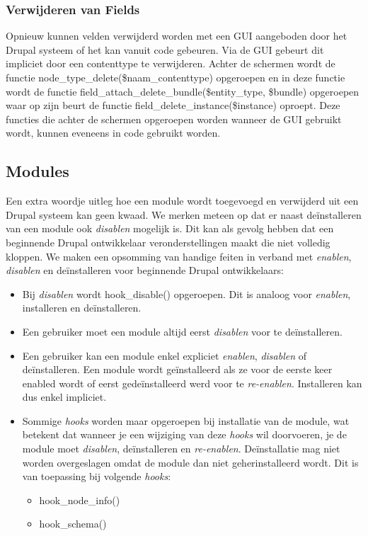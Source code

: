 \subsubsection{Verwijderen van Fields}
Opnieuw kunnen velden verwijderd worden met een GUI aangeboden door het Drupal systeem of het kan vanuit code gebeuren. Via de GUI gebeurt dit impliciet door een contenttype te verwijderen. Achter de schermen wordt de functie node\_type\_delete(\$naam\_contenttype) opgeroepen en in deze functie wordt de functie field\_attach\_delete\_bundle(\$entity\_type, \$bundle) opgeroepen waar op zijn beurt de functie field\_delete\_instance(\$instance) oproept. Deze functies die achter de schermen opgeroepen worden wanneer de GUI gebruikt wordt, kunnen eveneens in code gebruikt worden.

\subsection{Modules}
Een extra woordje uitleg hoe een module wordt toegevoegd en verwijderd uit een Drupal systeem kan geen kwaad. We merken meteen op dat er naast de\"{i}nstalleren van een module ook \textit{disablen} mogelijk is. Dit kan als gevolg hebben dat een beginnende Drupal ontwikkelaar veronderstellingen maakt die niet volledig kloppen. We maken een opsomming van handige feiten in verband met \textit{enablen}, \textit{disablen} en de\"{i}nstalleren voor beginnende Drupal ontwikkelaars:
\begin{itemize}
\item Bij \textit{disablen} wordt hook\_disable() opgeroepen. Dit is analoog voor \textit{enablen}, installeren en de\"{i}nstalleren.
\item Een gebruiker moet een module altijd eerst \textit{disablen} voor te de\"{i}nstalleren.
\item Een gebruiker kan een module enkel expliciet \textit{enablen}, \textit{disablen} of de\"{i}nstalleren. Een module wordt ge\"{i}nstalleerd als ze voor de eerste keer enabled wordt of eerst gede\"{i}nstalleerd werd voor te \textit{re-enablen}. Installeren kan dus enkel impliciet.
\item Sommige \textit{hooks} worden maar opgeroepen bij installatie van de module, wat betekent dat wanneer je een wijziging van deze \textit{hooks} wil doorvoeren, je de module moet \textit{disablen}, de\"{i}nstalleren en \textit{re-enablen}. De\"{i}nstallatie mag niet worden overgeslagen omdat de module dan niet geherinstalleerd wordt. Dit is van toepassing bij volgende \textit{hooks}:
\begin{itemize}
\item hook\_node\_info()
\item hook\_schema()
\end{itemize}
\end{itemize}

